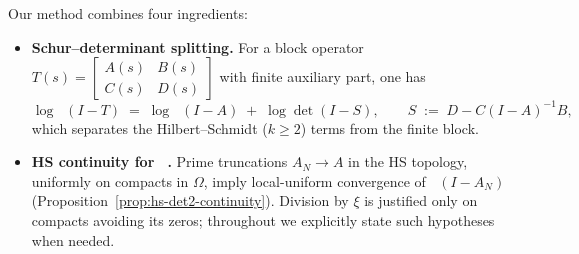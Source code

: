 \documentclass[11pt]{article}
\theoremstyle{definition}
\theoremstyle{remark}
\DeclareMathOperator{\dettwo}{det_2}
\begin{document}
Our method combines four ingredients:
\begin{itemize}
 \item \textbf{Schur--determinant splitting.} For a block operator \(T(s)=\begin{bmatrix}A(s)&B(s)\\ C(s)&D(s)\end{bmatrix}\) with finite auxiliary part, one has
 \[
  \log\dettwo(I-T)\;=\;\log\dettwo(I-A)\; +\; \log\det(I-S),\qquad S\;:=\;D-C(I-A)^{-1}B,
 \]
 which separates the Hilbert--Schmidt (\(k\ge 2\)) terms from the finite block.
 \item \textbf{HS continuity for \(\dettwo\).} Prime truncations \(A_N\to A\) in the HS topology, uniformly on compacts in \(\Omega\), imply local-uniform convergence of \(\dettwo(I-A_N)\) (Proposition~\ref{prop:hs-det2-continuity}). Division by \(\xi\) is justified only on compacts avoiding its zeros; throughout we explicitly state such hypotheses when needed.
\end{itemize}
\end{document}
